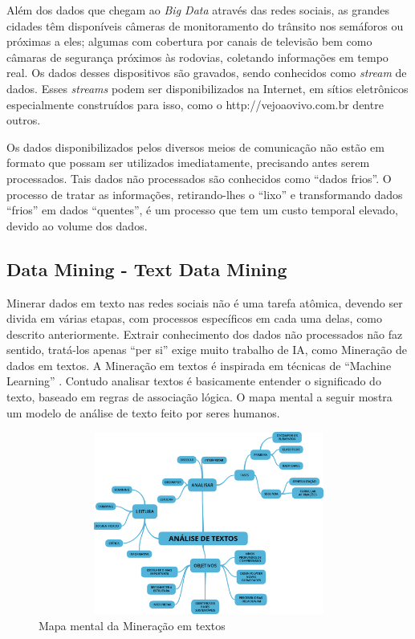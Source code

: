 Além dos dados que chegam ao \textit{Big Data} através das redes sociais, as grandes cidades têm disponíveis câmeras de monitoramento do trânsito nos semáforos ou próximas a eles; 
algumas com cobertura por canais de televisão bem como câmaras de segurança próximos às rodovias, coletando informações em tempo real. 
Os dados desses dispositivos são gravados, sendo conhecidos como \textit{stream} de dados. 
Esses \textit{streams} podem ser disponibilizados na Internet, em sítios eletrônicos especialmente construídos para isso, como o http://vejoaovivo.com.br dentre outros.

Os dados disponibilizados pelos diversos meios de comunicação não estão em formato que possam ser utilizados imediatamente, precisando antes serem processados. 
Tais dados não processados são conhecidos como ``dados frios''. O processo de tratar as informações, retirando-lhes o ``lixo'' e transformando dados ``frios'' em dados 
``quentes'', é um processo que tem um custo temporal elevado, devido ao volume dos dados.



\pagebreak
\subsection{ Data Mining - Text Data Mining}\label{arte:palavraChave:DataMiningBigData}

Minerar dados em texto nas redes sociais não é uma tarefa atômica, devendo ser divida em várias etapas, com processos específicos em cada uma delas, como descrito anteriormente. 
Extrair conhecimento dos dados não processados não faz sentido, tratá-los apenas ``per si'' exige muito trabalho de IA, como Mineração de dados em textos. 
A Mineração em textos é inspirada em técnicas de ``Machine Learning'' \cite{Aranha2006}. 
Contudo analisar textos é basicamente entender o significado do texto, baseado em regras de associação lógica.
O mapa mental a seguir mostra um modelo de análise de texto feito por seres humanos.

\begin{figure}[htpb]
\centering
\caption{Mapa mental da Mineração em textos}
\includegraphics[width=120mm, height=60mm]{Figuras/BigData/Analise_Textos.png}
\end{figure}
